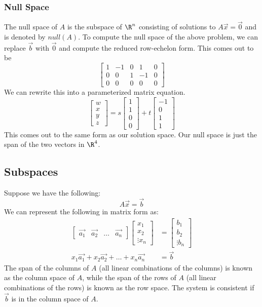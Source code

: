 \documentclass{math}
\begin{document}
\subsubsection*{Null Space}
The null space of \( A \) is the subspace of \( \R^n \) consisting of solutions
to \( A\vec{x} = \vec{0} \) and is denoted by \( null(A) \). To compute the
null space of the above problem, we can replace \( \vec{b} \) with \( \vec{0} \)
and compute the reduced row-echelon form. This comes out to be
\[ \begin{bmatrix}
  1 & -1 & 0 & 1 & 0 \\
  0 & 0 & 1 & -1 & 0 \\
  0 & 0 & 0 & 0 & 0
\end{bmatrix} \]
We can rewrite this into a parameterized matrix equation.
\[ \begin{bmatrix}w \\ x \\ y \\ z\end{bmatrix} =
  s\begin{bmatrix}1 \\ 1 \\ 0 \\ 0\end{bmatrix}+
  t\begin{bmatrix}-1 \\ 0 \\ 1 \\ 1\end{bmatrix} \]
This comes out to the same form as our solution space. Our null space is just
the span of the two vectors in \( \R^4 \).

\subsection*{Subspaces}
Suppose we have the following:
\[ A\vec{x} = \vec{b} \]
We can represent the following in matrix form as:
\begin{align*}
  \begin{bmatrix}
    \vec{a_1} & \vec{a_2} & \dots & \vec{a_n}
  \end{bmatrix}\begin{bmatrix}
    x_1 \\ x_2 \\ \vdots x_n
  \end{bmatrix} &= \begin{bmatrix}
    b_1 \\ b_2 \\ \vdots b_n
  \end{bmatrix} \\
  x_1\vec{a_1}+x_2\vec{a_2}+\dots+x_n\vec{a_n} &= \vec{b}
\end{align*}
The span of the columns of \( A \) (all linear combinations of the columns)
is known as the column space of \( A \), while the span of the rows of \( A \)
(all linear combinations of the rows) is known as the row space. The system is
consistent if \( \vec{b} \) is in the column space of \( A \).
\end{document}
